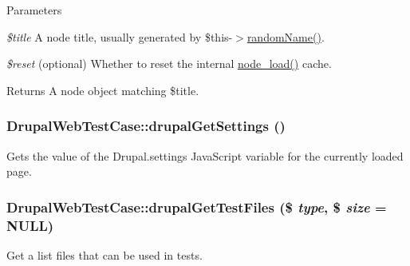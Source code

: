 \begin{DoxyParams}{Parameters}
\item[{\em \$title}]A node title, usually generated by \$this-\/$>$\hyperlink{classDrupalTestCase_ab1137ec76434cdd38ec267977ba153d5}{randomName()}. \item[{\em \$reset}](optional) Whether to reset the internal \hyperlink{node_8module_a492ddfc12843e71242bb484a44e51a19}{node\_\-load()} cache.\end{DoxyParams}
\begin{DoxyReturn}{Returns}
A node object matching \$title. 
\end{DoxyReturn}
\hypertarget{classDrupalWebTestCase_a26f4d98c9c74d18e7a97a307bc9507f7}{
\subsubsection[{drupalGetSettings}]{\setlength{\rightskip}{0pt plus 5cm}DrupalWebTestCase::drupalGetSettings ()}}
\label{classDrupalWebTestCase_a26f4d98c9c74d18e7a97a307bc9507f7}
Gets the value of the Drupal.settings JavaScript variable for the currently loaded page. \hypertarget{classDrupalWebTestCase_ad1439acbfb7b5cd34e851d49106ba92f}{
\subsubsection[{drupalGetTestFiles}]{\setlength{\rightskip}{0pt plus 5cm}DrupalWebTestCase::drupalGetTestFiles (\$ {\em type}, \/  \$ {\em size} = {\ttfamily NULL})}}
\label{classDrupalWebTestCase_ad1439acbfb7b5cd34e851d49106ba92f}
Get a list files that can be used in tests.


